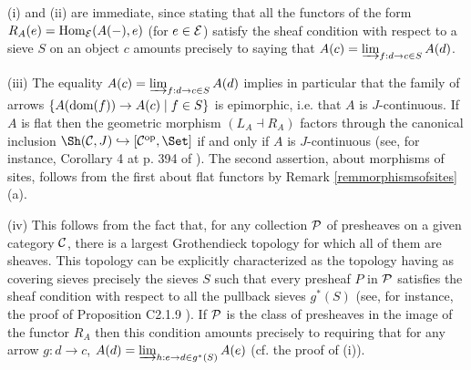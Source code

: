 \documentclass[a4paper,12pt]{article}
\begin{document}
\begin{proofs}
	(i) and (ii) are immediate, since stating that all the functors of the form $R_{A}(e)=\textup{Hom}_{\cal E}(A(-), e)$ (for $e\in {\cal E}$) satisfy the sheaf condition with respect to a sieve $S$ on an object $c$ amounts precisely to saying that $A(c)=\varinjlim_{f:d\to c \in S} A(d)$. 
	
	(iii) The equality $A(c)=\varinjlim_{f:d\to c \in S} A(d)$ implies in particular that the family of arrows $\{A(\textup{dom}(f)) \to A(c) \mid f\in S\}$ is epimorphic, i.e. that $A$ is $J$-continuous. If $A$ is flat then the geometric morphism $(L_{A}\dashv R_{A})$ factors through the canonical inclusion $\Sh({\cal C}, J)\hookrightarrow [{\cal C}^{\textup{op}}, \Set]$ if and only if $A$ is $J$-continuous (see, for instance, Corollary 4 at p. 394 of \cite{MM}). The second assertion, about morphisms of sites, follows from the first about flat functors by Remark \ref{remmorphismsofsites}(a).
	
	(iv) This follows from the fact that, for any collection $\cal P$ of presheaves on a given category $\cal C$, there is a largest Grothendieck topology for which all of them are sheaves. This topology can be explicitly characterized as the topology having as covering sieves precisely the sieves $S$ such that every presheaf $P$ in $\cal P$ satisfies the sheaf condition with respect to all the pullback sieves $g^{\ast}(S)$ (see, for instance, the proof of Proposition C2.1.9 \cite{El}). If $\cal P$ is the class of presheaves in the image of the functor $R_{A}$ then this condition amounts precisely to requiring that for any arrow $g:d\to c$, $A(d)=\varinjlim_{h:e\to d \in g^{\ast}(S)} A(e)$ (cf. the proof of (i)).
\end{proofs}
\end{document}
